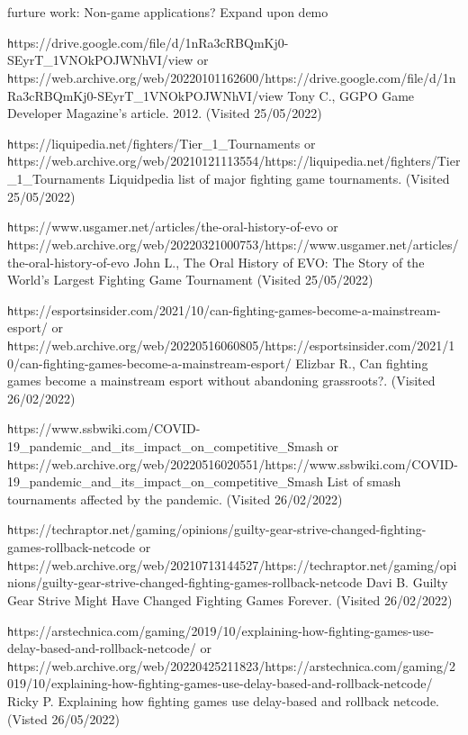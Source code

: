 \documentclass{entcs}
\begin{document}
furture work: 
Non-game applications? Expand upon demo
\begin{thebibliography}{25}

 {\texttt https://drive.google.com/file/d/1nRa3cRBQmKj0-SEyrT\_1VNOkPOJWNhVI/view} or 
{\texttt https://web.archive.org/web/20220101162600/https://drive.google.com/file/d/1nRa3cRBQmKj0-SEyrT\_1VNOkPOJWNhVI/view} 
Tony C., GGPO Game Developer Magazine's article. 2012. (Visited 25/05/2022)

 {\texttt https://liquipedia.net/fighters/Tier\_1\_Tournaments} or 
{\texttt https://web.archive.org/web/20210121113554/https://liquipedia.net/fighters/Tier\_1\_Tournaments} 
Liquidpedia list of major fighting game tournaments. (Visited 25/05/2022)

 {\texttt https://www.usgamer.net/articles/the-oral-history-of-evo} or 
{\texttt https://web.archive.org/web/20220321000753/https://www.usgamer.net/articles/the-oral-history-of-evo} 
John L., The Oral History of EVO: The Story of the World's Largest Fighting Game Tournament (Visited 25/05/2022)

 {\texttt https://esportsinsider.com/2021/10/can-fighting-games-become-a-mainstream-esport/} or 
{\texttt https://web.archive.org/web/20220516060805/https://esportsinsider.com/2021/10/can-fighting-games-become-a-mainstream-esport/} 
Elizbar R., Can fighting games become a mainstream esport without abandoning grassroots?. (Visited 26/02/2022) 

 {\texttt https://www.ssbwiki.com/COVID-19\_pandemic\_and\_its\_impact\_on\_competitive\_Smash} or {\texttt https://web.archive.org/web/20220516020551/https://www.ssbwiki.com/COVID-19\_pandemic\_and\_its\_impact\_on\_competitive\_Smash} List of smash tournaments affected by the pandemic. (Visited 26/02/2022) 

 {\texttt https://techraptor.net/gaming/opinions/guilty-gear-strive-changed-fighting-games-rollback-netcode} or {\texttt https://web.archive.org/web/20210713144527/https://techraptor.net/gaming/opinions/guilty-gear-strive-changed-fighting-games-rollback-netcode} Davi B. Guilty Gear Strive Might Have Changed Fighting Games Forever. (Visited 26/02/2022)

 {\texttt https://arstechnica.com/gaming/2019/10/explaining-how-fighting-games-use-delay-based-and-rollback-netcode/} or {\texttt https://web.archive.org/web/20220425211823/https://arstechnica.com/gaming/2019/10/explaining-how-fighting-games-use-delay-based-and-rollback-netcode/} Ricky P. Explaining how fighting games use delay-based and rollback netcode. (Visted 26/05/2022)


\end{thebibliography}
\end{document}
